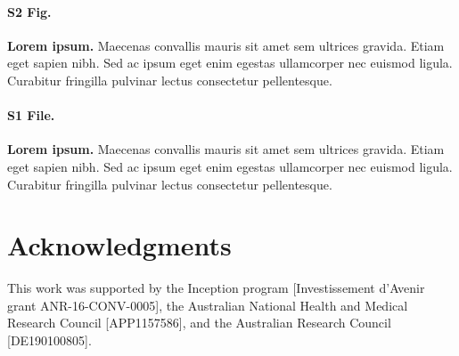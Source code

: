 \documentclass[10pt,letterpaper]{article}
\begin{document}
\paragraph*{S2 Fig.}
\label{S2_Fig}
{\bf Lorem ipsum.} Maecenas convallis mauris sit amet sem ultrices gravida. Etiam eget sapien nibh. Sed ac ipsum eget enim egestas ullamcorper nec euismod ligula. Curabitur fringilla pulvinar lectus consectetur pellentesque.

\paragraph*{S1 File.}
\label{file:S1_File}
{\bf Lorem ipsum.}  Maecenas convallis mauris sit amet sem ultrices gravida. Etiam eget sapien nibh. Sed ac ipsum eget enim egestas ullamcorper nec euismod ligula. Curabitur fringilla pulvinar lectus consectetur pellentesque.

\section*{Acknowledgments}
This work was supported by the Inception program [Investissement d’Avenir grant ANR-16-CONV-0005], the Australian National Health and Medical Research Council [APP1157586], and the Australian Research Council [DE190100805].

\nolinenumbers

%
%
% 





\end{document}
